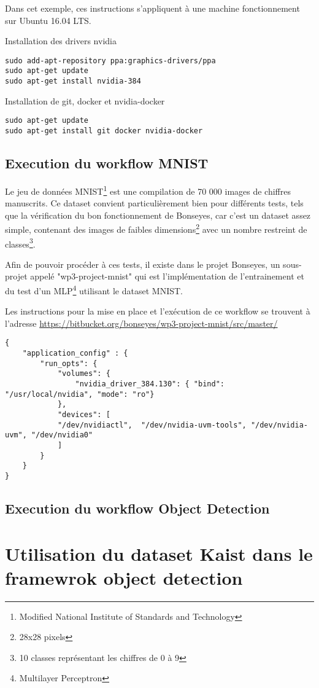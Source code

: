 Dans cet exemple, ces instructions s'appliquent à une machine fonctionnement sur Ubuntu 16.04 LTS.

Installation des drivers nvidia
\begin{lstlisting}
sudo add-apt-repository ppa:graphics-drivers/ppa
sudo apt-get update
sudo apt-get install nvidia-384
\end{lstlisting}

Installation de git, docker et nvidia-docker
\begin{lstlisting}
sudo apt-get update
sudo apt-get install git docker nvidia-docker
\end{lstlisting}




\subsection{Execution du workflow MNIST}

Le jeu de données MNIST\footnote{Modified National Institute of Standards and Technology} est une compilation de 70 000 images de chiffres manuscrits. Ce dataset convient particulièrement bien pour différents tests, tels que la vérification du bon fonctionnement de Bonseyes, car c'est un dataset assez simple, contenant des images de faibles dimensions\footnote{28x28 pixels} avec un nombre restreint de classes\footnote{10 classes représentant les chiffres de 0 à 9}.

Afin de pouvoir procéder à ces tests, il existe dans le projet Bonseyes, un sous-projet appelé "wp3-project-mnist" qui est l'implémentation de l'entrainement et du test d'un MLP\footnote{Multilayer Perceptron} utilisant le dataset MNIST.



Les instructions pour la mise en place et l'exécution de ce workflow se trouvent à l'adresse \url{https://bitbucket.org/bonseyes/wp3-project-mnist/src/master/}

\begin{lstlisting}
{
	"application_config" : {
		"run_opts": {
			"volumes": {
				"nvidia_driver_384.130": { "bind": "/usr/local/nvidia", "mode": "ro"}
			},
			"devices": [
			"/dev/nvidiactl",  "/dev/nvidia-uvm-tools", "/dev/nvidia-uvm", "/dev/nvidia0"
			]
		}
	}
}
\end{lstlisting}

\subsection{Execution du workflow Object Detection}

\section{Utilisation du dataset Kaist dans le framewrok object detection}
